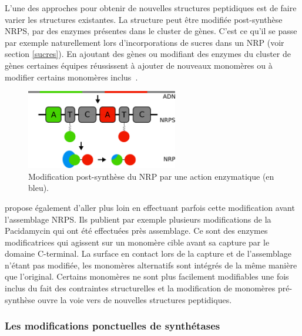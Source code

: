 L'une des approches pour obtenir de nouvelles structures peptidiques est de faire varier les structures existantes.
La structure peut être modifiée post-synthèse NRPS, par des enzymes présentes dans le cluster de gènes.
C'est ce qu'il se passe par exemple naturellement lors d'incorporations de sucres dans un NRP (voir section \ref{sucres}).
En ajoutant des gènes ou modifiant des enzymes du cluster de gènes certaines équipes réussissent à ajouter de nouveaux monomères ou à modifier certains monomères inclus~\cite{giessen_ribosome-independent_2012}.

\begin{figure}[h!]
  \begin{center}
    \includegraphics[width=250px]{Figures/synthese/post_synth.png}
    \caption{\label{post_synth}Modification post-synthèse du NRP par une action enzymatique (en bleu).}
  \end{center}
\end{figure}

\cite{winn_recent_2016} propose également d'aller plus loin en effectuant parfois cette modification avant l'assemblage NRPS.
Ils publient par exemple plusieurs modifications de la Pacidamycin qui ont été effectuées près assemblage.
Ce sont des enzymes modificatrices qui agissent sur un monomère cible avant sa capture par le domaine C-terminal.
La surface en contact lors de la capture et de l'assemblage n'étant pas modifiée, les monomères alternatifs sont intégrés de la même manière que l'original.
Certains monomères ne sont plus facilement modifiables une fois inclus du fait des contraintes structurelles et la modification de monomères pré-synthèse ouvre la voie vers de nouvelles structures peptidiques.


\subsubsection{Les modifications ponctuelles de synthétases}

